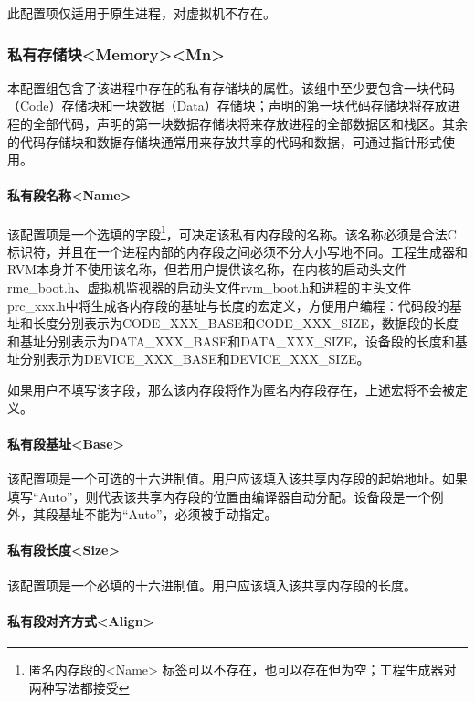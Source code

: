 此配置项仅适用于原生进程，对虚拟机不存在。

\subsubsection{私有存储块<Memory><Mn>{}}\label{subsubsec:5-3-14-14}

本配置组包含了该进程中存在的私有存储块的属性。该组中至少要包含一块代码（Code）存储块和一块数据（Data）存储块；声明的第一块代码存储块将存放进程的全部代码，声明的第一块数据存储块将来存放进程的全部数据区和栈区。其余的代码存储块和数据存储块通常用来存放共享的代码和数据，可通过指针形式使用。

\paragraph{私有段名称<Name>{}}\label{par:5-3-14-14-1}

该配置项是一个选填的字段\footnote{匿名内存段的<Name> 标签可以不存在，也可以存在但为空；工程生成器对两种写法都接受}，可决定该私有内存段的名称。该名称必须是合法C标识符，并且在一个进程内部的内存段之间必须不分大小写地不同。工程生成器和RVM本身并不使用该名称，但若用户提供该名称，在内核的启动头文件rme\_boot.h、虚拟机监视器的启动头文件rvm\_boot.h和进程的主头文件prc\_xxx.h中将生成各内存段的基址与长度的宏定义，方便用户编程：代码段的基址和长度分别表示为CODE\_XXX\_BASE和CODE\_XXX\_SIZE，数据段的长度和基址分别表示为DATA\_XXX\_BASE和DATA\_XXX\_SIZE，设备段的长度和基址分别表示为DEVICE\_XXX\_BASE和DEVICE\_XXX\_SIZE。

如果用户不填写该字段，那么该内存段将作为匿名内存段存在，上述宏将不会被定义。

\paragraph{私有段基址<Base>{}}\label{par:5-3-14-14-2}

该配置项是一个可选的十六进制值。用户应该填入该共享内存段的起始地址。如果填写``Auto''，则代表该共享内存段的位置由编译器自动分配。设备段是一个例外，其段基址不能为``Auto''，必须被手动指定。

\paragraph{私有段长度<Size>{}}\label{par:5-3-14-14-3}

该配置项是一个必填的十六进制值。用户应该填入该共享内存段的长度。

\paragraph{私有段对齐方式<Align>{}}\label{par:5-3-14-14-4}

